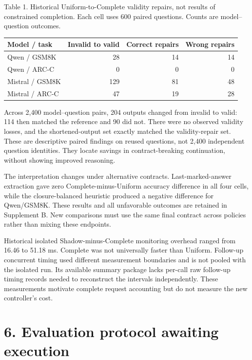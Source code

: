 \documentclass[
  12pt,
  a4paper,
]{article}
\begin{document}
Table 1. Historical Uniform-to-Complete validity repairs, not results of
constrained completion. Each cell uses 600 paired questions. Counts are
model--question outcomes.

\begin{longtable}[]{@{}lrrr@{}}
\toprule\noalign{}
Model / task & Invalid to valid & Correct repairs & Wrong repairs \\
\midrule\noalign{}
\endhead
\bottomrule\noalign{}
\endlastfoot
Qwen / GSM8K & 28 & 14 & 14 \\
Qwen / ARC-C & 0 & 0 & 0 \\
Mistral / GSM8K & 129 & 81 & 48 \\
Mistral / ARC-C & 47 & 19 & 28 \\
\end{longtable}

Across 2,400 model--question pairs, 204 outputs changed from invalid to
valid: 114 then matched the reference and 90 did not. There were no
observed validity losses, and the shortened-output set exactly matched
the validity-repair set. These are descriptive paired findings on reused
questions, not 2,400 independent question identities. They locate
savings in contract-breaking continuation, without showing improved
reasoning.

The interpretation changes under alternative contracts.
Last-marked-answer extraction gave zero Complete-minus-Uniform accuracy
difference in all four cells, while the closure-balanced heuristic
produced a negative difference for Qwen/GSM8K. These results and all
unfavorable outcomes are retained in Supplement B. New comparisons must
use the same final contract across policies rather than mixing these
endpoints.

Historical isolated Shadow-minus-Complete monitoring overhead ranged
from 16.46 to 51.18 ms. Complete was not universally faster than
Uniform. Follow-up concurrent timing used different measurement
boundaries and is not pooled with the isolated run. Its available
summary package lacks per-call raw follow-up timing records needed to
reconstruct the intervals independently. These measurements motivate
complete request accounting but do not measure the new controller's
cost.

\section{6. Evaluation protocol awaiting
execution}\label{evaluation-protocol-awaiting-execution}
\end{document}
